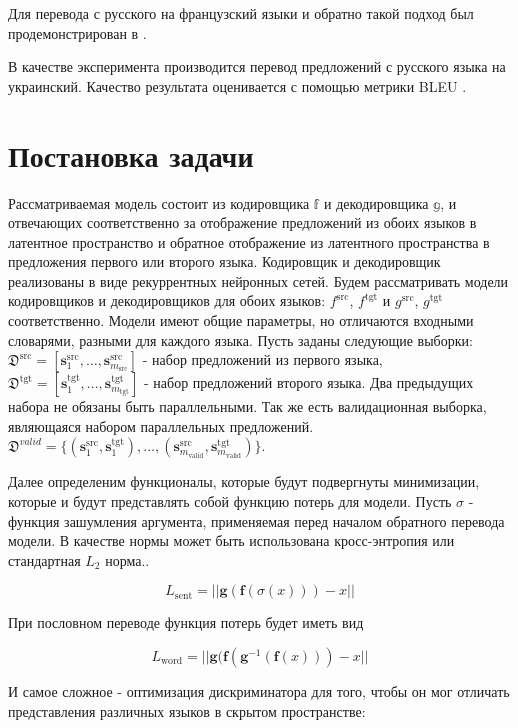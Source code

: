\documentclass[12pt,twoside]{article}
\begin{document}
Для перевода с русского на французский языки и обратно такой подход был продемонстрирован в \cite{lample2017unsupervised}.

В качестве эксперимента производится перевод предложений с русского языка на украинский. Качество результата оценивается с помощью метрики BLEU \cite{papineni2002bleu}.

\section{Постановка задачи}

Рассматриваемая модель состоит из кодировщика $\mathbb{f}$ и декодировщика $\mathbb{g}$, и отвечающих соответственно за отображение предложений из обоих языков в латентное пространство и обратное отображение из латентного пространства в предложения первого или второго языка. Кодировщик и декодировщик реализованы в виде рекуррентных нейронных сетей. Будем рассматривать модели кодировщиков и декодировщиков для обоих языков: $f^\text{src}$, $f^\text{tgt}$ и $g^\text{src}$, $g^\text{tgt}$ соответственно. Модели имеют общие параметры, но отличаются входными словарями, разными для каждого языка. Пусть заданы следующие выборки: $\mathfrak{D}^{\text{src}} = [\mathbf{s}_1^{\text{src}}, \dots, \mathbf{s}_{m_\text{src}}^{\text{src}}]$ - набор предложений из первого языка, $\mathfrak{D}^{\text{tgt}} = [\mathbf{s}_1^{\text{tgt}}, \dots, \mathbf{s}_{m_\text{tgt}}^{\text{tgt}}]$ - набор предложений второго языка. Два предыдущих набора не обязаны быть параллельными. Так же есть валидационная выборка, являющаяся набором параллельных предложений. $\mathfrak{D}^{valid} = \{(\mathbf{s}_1^{\text{src}}, \mathbf{s}_1^{\text{tgt}}), \dots, (\mathbf{s}_{m_\text{valid}}^{\text{src}}, \mathbf{s}_{m_\text{valid}}^{\text{tgt}})\}$.

Далее определеним функционалы, которые будут подвергнуты минимизации, которые и будут представлять собой функцию потерь для модели.  Пусть $\sigma$ - функция зашумления аргумента, применяемая перед началом обратного перевода модели. В качестве нормы может быть использована кросс-энтропия или стандартная $L_2$ норма..

$$L_{\text{sent}} = ||\mathbf{g}(\mathbf{f}(\sigma(x)))-x||$$

При пословном переводе функция потерь будет иметь вид

$$L_{\text{word}} = ||\mathbf{g}(\mathbf{f}(\mathbf{g}^{-1}(\mathbf{f}(x))) - x||$$

И самое сложное - оптимизация дискриминатора для того, чтобы он мог отличать представления различных языков в скрытом пространстве:
\end{document}
